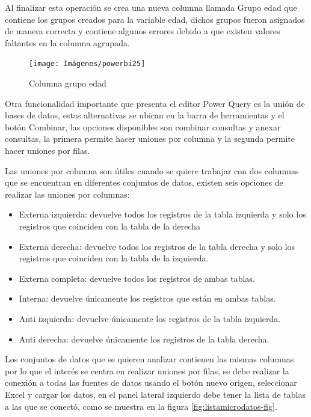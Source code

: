 \documentclass[
]{book}
\providecommand{\tightlist}{%
  \setlength{\itemsep}{0pt}\setlength{\parskip}{0pt}}
\begin{document}
Al finalizar esta operación se crea una nueva columna llamada Grupo edad que contiene los grupos creados para la variable edad, dichos grupos fueron asignados de manera correcta y contiene algunos errores debido a que existen valores faltantes en la columna agrupada.

\begin{figure}

{\centering \texttt{[image: Imágenes/powerbi25]} 

}

\caption{Columna grupo edad}\label{fig:columnacondicionalfinal-fig}
\end{figure}

Otra funcionalidad importante que presenta el editor Power Query es la unión de bases de datos, estas alternativas se ubican en la barra de herramientas y el botón Combinar, las opciones disponibles son combinar consultas y anexar consultas, la primera permite hacer uniones por columna y la segunda permite hacer uniones por filas.

Las uniones por columna son útiles cuando se quiere trabajar con dos columnas que se encuentran en diferentes conjuntos de datos, existen seis opciones de realizar las uniones por columnas:

\begin{itemize}
\tightlist
\item
  Externa izquierda: devuelve todos los registros de la tabla izquierda y solo los registros que coinciden con la tabla de la derecha
\item
  Externa derecha: devuelve todos los registros de la tabla derecha y solo los registros que coinciden con la tabla de la izquierda.
\item
  Externa completa: devuelve todos los registros de ambas tablas.
\item
  Interna: devuelve únicamente los registros que están en ambas tablas.
\item
  Anti izquierda: devuelve únicamente los registros de la tabla izquierda.
\item
  Anti derecha: devuelve únicamente los registros de la tabla derecha.
\end{itemize}

Los conjuntos de datos que se quieren analizar contienen las mismas columnas por lo que el interés se centra en realizar uniones por filas, se debe realizar la conexión a todas las fuentes de datos usando el botón nuevo origen, seleccionar Excel y cargar los datos, en el panel lateral izquierdo debe tener la lista de tablas a las que se conectó, como se muestra en la figura \ref{fig:listamicrodatos-fig}.
\end{document}
